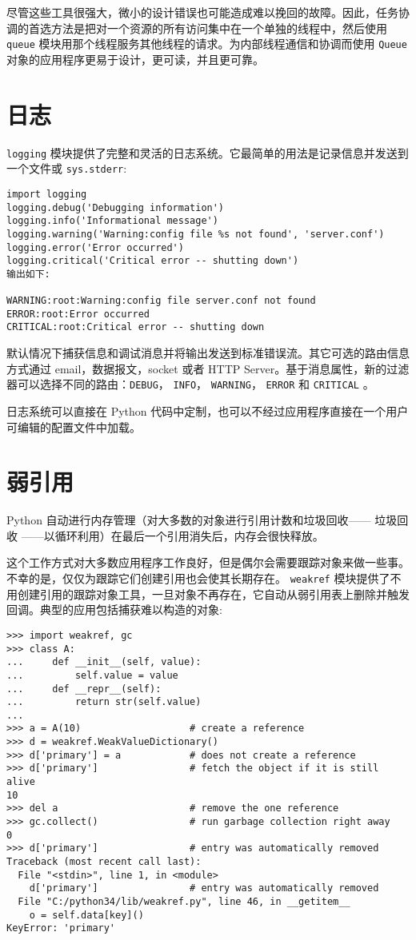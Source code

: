 尽管这些工具很强大，微小的设计错误也可能造成难以挽回的故障。因此，任务协调的首选方法是把对一个资源的所有访问集中在一个单独的线程中，然后使用 \texttt{queue} 模块用那个线程服务其他线程的请求。为内部线程通信和协调而使用 \texttt{Queue} 对象的应用程序更易于设计，更可读，并且更可靠。
\section{日志}
\texttt{logging} 模块提供了完整和灵活的日志系统。它最简单的用法是记录信息并发送到一个文件或 \texttt{sys.stderr}:
\begin{lstlisting}
import logging
logging.debug('Debugging information')
logging.info('Informational message')
logging.warning('Warning:config file %s not found', 'server.conf')
logging.error('Error occurred')
logging.critical('Critical error -- shutting down')
输出如下:

WARNING:root:Warning:config file server.conf not found
ERROR:root:Error occurred
CRITICAL:root:Critical error -- shutting down
\end{lstlisting}
默认情况下捕获信息和调试消息并将输出发送到标准错误流。其它可选的路由信息方式通过 email，数据报文，socket 或者 HTTP Server。基于消息属性，新的过滤器可以选择不同的路由：\texttt{DEBUG}， \texttt{INFO}， \texttt{WARNING}， \texttt{ERROR} 和 \texttt{CRITICAL} 。

日志系统可以直接在 Python 代码中定制，也可以不经过应用程序直接在一个用户可编辑的配置文件中加载。
\section{弱引用}
Python 自动进行内存管理（对大多数的对象进行引用计数和垃圾回收—— 垃圾回收 ——以循环利用）在最后一个引用消失后，内存会很快释放。

这个工作方式对大多数应用程序工作良好，但是偶尔会需要跟踪对象来做一些事。不幸的是，仅仅为跟踪它们创建引用也会使其长期存在。 \texttt{weakref} 模块提供了不用创建引用的跟踪对象工具，一旦对象不再存在，它自动从弱引用表上删除并触发回调。典型的应用包括捕获难以构造的对象:
\begin{lstlisting}
>>> import weakref, gc
>>> class A:
...     def __init__(self, value):
...         self.value = value
...     def __repr__(self):
...         return str(self.value)
...
>>> a = A(10)                   # create a reference
>>> d = weakref.WeakValueDictionary()
>>> d['primary'] = a            # does not create a reference
>>> d['primary']                # fetch the object if it is still alive
10
>>> del a                       # remove the one reference
>>> gc.collect()                # run garbage collection right away
0
>>> d['primary']                # entry was automatically removed
Traceback (most recent call last):
  File "<stdin>", line 1, in <module>
    d['primary']                # entry was automatically removed
  File "C:/python34/lib/weakref.py", line 46, in __getitem__
    o = self.data[key]()
KeyError: 'primary'
\end{lstlisting}

